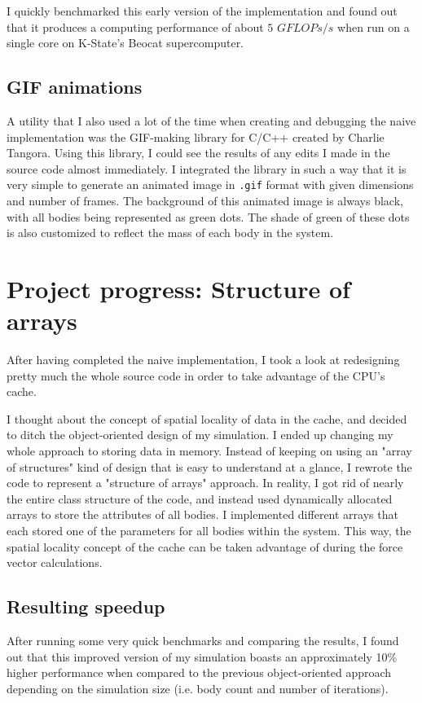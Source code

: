 \documentclass[journal]{IEEEtran}
\begin{document}
		I quickly benchmarked this early version of the implementation and found out that it produces a computing performance of about $5$ $GFLOPs/s$ when run on a single core on K-State's Beocat supercomputer.
		
		\subsection*{GIF animations}
		
			A utility that I also used a lot of the time when creating and debugging the naive implementation was the GIF-making library for C/C++ created by Charlie Tangora. \cite{gif} Using this library, I could see the results of any edits I made in the source code almost immediately. I integrated the library in such a way that it is very simple to generate an animated image in \texttt{.gif} format with given dimensions and number of frames. The background of this animated image is always black, with all bodies being represented as green dots. The shade of green of these dots is also customized to reflect the mass of each body in the system.
		
	\section{Project progress: Structure of arrays}
		
		After having completed the naive implementation, I took a look at redesigning pretty much the whole source code in order to take advantage of the CPU's cache.
		
		I thought about the concept of spatial locality of data in the cache, and decided to ditch the object-oriented design of my simulation. I ended up changing my whole approach to storing data in memory. Instead of keeping on using an "array of structures" kind of design that is easy to understand at a glance, I rewrote the code to represent a "structure of arrays" approach. In reality, I got rid of nearly the entire class structure of the code, and instead used dynamically allocated arrays to store the attributes of all bodies. I implemented different arrays that each stored one of the parameters for all bodies within the system. This way, the spatial locality concept of the cache can be taken advantage of during the force vector calculations.
		
		\subsection*{Resulting speedup}
			After running some very quick benchmarks and comparing the results, I found out that this improved version of my simulation boasts an approximately 10\% higher performance when compared to the previous object-oriented approach depending on the simulation size (i.e. body count and number of iterations).
			
\end{document}
